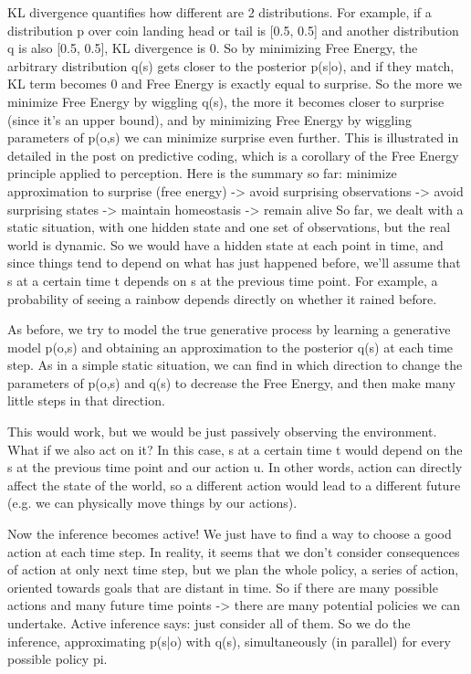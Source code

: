 \documentclass[12pt]{article}
\begin{document}
KL divergence quantifies how different are 2 distributions. For example, if a distribution p over coin landing head or tail is [0.5, 0.5] and another distribution q is also [0.5, 0.5], KL divergence is 0.
So by minimizing Free Energy, the arbitrary distribution q(s) gets closer to the posterior p(s|o), and if they match, KL term becomes 0 and Free Energy is exactly equal to surprise. So the more we minimize Free Energy by wiggling q(s), the more it becomes closer to surprise (since it’s an upper bound), and by minimizing Free Energy by wiggling parameters of p(o,s) we can minimize surprise even further. This is illustrated in detailed in the post on predictive coding, which is a corollary of the Free Energy principle applied to perception. Here is the summary so far: minimize approximation to surprise (free energy) -> avoid surprising observations -> avoid surprising states -> maintain homeostasis -> remain alive
So far, we dealt with a static situation, with one hidden state and one set of observations, but the real world is dynamic. So we would have a hidden state at each point in time, and since things tend to depend on what has just happened before, we'll assume that s at a certain time t depends on s at the previous time point. For example, a probability of seeing a rainbow depends directly on whether it rained before.

As before, we try to model the true generative process by learning a generative model p(o,s) and obtaining an approximation to the posterior q(s) at each time step. As in a simple static situation, we can find in which direction to change the parameters of p(o,s) and q(s) to decrease the Free Energy, and then make many little steps in that direction.

This would work, but we would be just passively observing the environment. What if we also act on it? In this case, s at a certain time t would depend on the s at the previous time point and our action u. In other words, action can directly affect the state of the world, so a different action would lead to a different future (e.g. we can physically move things by our actions).

Now the inference becomes active! We just have to find a way to choose a good action at each time step. In reality, it seems that we don't consider consequences of action at only next time step, but we plan the whole policy, a series of action, oriented towards goals that are distant in time. So if there are many possible actions and many future time points -> there are many potential policies we can undertake. Active inference says: just consider all of them. So we do the inference, approximating p(s|o) with q(s), simultaneously (in parallel) for every possible policy pi.
\end{document}
